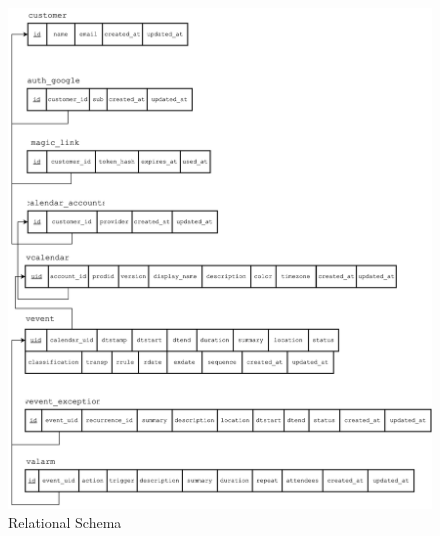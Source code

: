 \begin{figure}[!h]
    \centering
    \includegraphics[width=\textwidth]{images/database-schema.png}
    \caption{Relational Schema}
    \label{fig:relational-schema}
\end{figure}





\cleardoublepage
